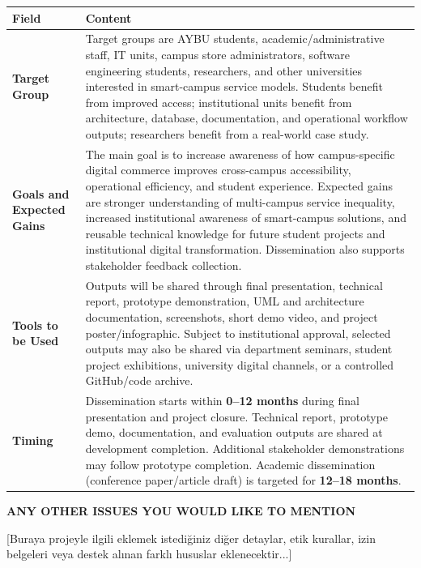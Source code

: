 \documentclass[10pt,a4paper]{article}
\newcommand{\sectionlabel}[1]{\vspace{1.2em}\noindent\textbf{\fontsize{10.5}{12}\selectfont #1}\par\vspace{0.4em}}
\begin{document}
\small
\begin{longtable}{|P{0.24\textwidth}|P{0.69\textwidth}|}
\hline
\textbf{Field} & \textbf{Content} \\ \hline
\textbf{Target Group} & Target groups are AYBU students, academic/administrative staff, IT units, campus store administrators, software engineering students, researchers, and other universities interested in smart-campus service models. Students benefit from improved access; institutional units benefit from architecture, database, documentation, and operational workflow outputs; researchers benefit from a real-world case study. \\ \hline
\textbf{Goals and Expected Gains} & The main goal is to increase awareness of how campus-specific digital commerce improves cross-campus accessibility, operational efficiency, and student experience. Expected gains are stronger understanding of multi-campus service inequality, increased institutional awareness of smart-campus solutions, and reusable technical knowledge for future student projects and institutional digital transformation. Dissemination also supports stakeholder feedback collection. \\ \hline
\textbf{Tools to be Used} & Outputs will be shared through final presentation, technical report, prototype demonstration, UML and architecture documentation, screenshots, short demo video, and project poster/infographic. Subject to institutional approval, selected outputs may also be shared via department seminars, student project exhibitions, university digital channels, or a controlled GitHub/code archive. \\ \hline
\textbf{Timing} & Dissemination starts within \textbf{0--12 months} during final presentation and project closure. Technical report, prototype demo, documentation, and evaluation outputs are shared at development completion. Additional stakeholder demonstrations may follow prototype completion. Academic dissemination (conference paper/article draft) is targeted for \textbf{12--18 months}. \\ \hline
\end{longtable}
\normalsize

\sectionlabel{ANY OTHER ISSUES YOU WOULD LIKE TO MENTION}
[Buraya projeyle ilgili eklemek istediğiniz diğer detaylar, etik kurallar, izin belgeleri veya destek alınan farklı hususlar eklenecektir...]
\end{document}
